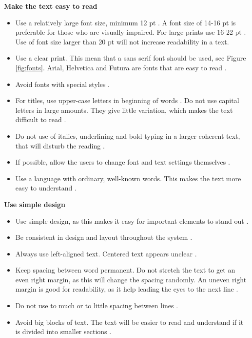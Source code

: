 \textbf{Make the text easy to read}
\begin{itemize} 
\item Use a relatively large font size, minimum 12 pt \cite{blindeforbundetTekst} \cite{evengrounds}. A font size of 14-16 pt is preferable for those who are visually impaired. For large prints use 16-22 pt \cite{actionforblindpeopleTekst}. Use of font size larger than 20 pt will not increase readability in a text.     
\item Use a clear print. This mean that a sans serif font should be used, see Figure \ref{fig:fonts}. Arial, Helvetica and Futura are fonts that are easy to read \cite{actionforblindpeopleTekst}.
\item Avoid fonts with special styles \cite{blindeforbundetTekst} \cite{actionforblindpeopleTekst}.
\item For titles, use upper-case letters in beginning of words \cite{actionforblindpeopleTekst}. Do not use capital letters in large amounts. They give little variation, which makes the text difficult to read \cite{blindeforbundetTekst}. 
\item Do not use of italics, underlining and bold typing in a larger coherent text, that will disturb the reading \cite{blindeforbundetTekst} \cite{actionforblindpeopleTekst}.  
\item If possible, allow the users to change font and text settings themselves \cite{blindeforbundetTekst} \cite{w3cTekst}. 
\item Use a language with ordinary, well-known words. This makes the text more easy to understand \cite{w3cTekst}. \\ 
\end{itemize}

\textbf{Use simple design}
\begin{itemize} 
\item Use simple design, as this makes it easy for important elements to stand out \cite{actionforblindpeopleTekst}.
\item Be consistent in design and layout throughout the system \cite{actionforblindpeopleTekst}.
\item Always use left-aligned text. Centered text appears unclear \cite{actionforblindpeopleTekst}.  
\item Keep spacing between word permanent. Do not stretch the text to get an even right margin, as this will change the spacing randomly. An uneven right margin is good for readability, as it help leading the eyes to the next line \cite{blindeforbundetTekst} \cite{actionforblindpeopleTekst}.
\item Do not use to much or to little spacing between lines \cite{blindeforbundetTekst} \cite{actionforblindpeopleTekst}. 
\item Avoid big blocks of text. The text will be easier to read and understand if it is divided into smaller sections \cite{blindeforbundetTekst} \cite{actionforblindpeopleTekst} \cite{evengrounds}. \\  
\end{itemize}

